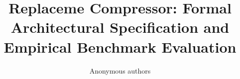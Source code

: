 \title{\textbf{Replaceme Compressor: Formal Architectural Specification and Empirical Benchmark Evaluation}}

\author{Anonymous authors}
